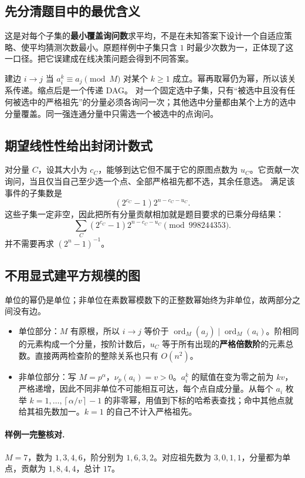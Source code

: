 \documentclass[UTF8,a4paper,11pt,oneside,openany,fontset=fandol]{ctexbook}
\theoremstyle{definition}
\newcommand{\ord}{\operatorname{ord}}
\newcommand{\ceil}[1]{\left\lceil #1\right\rceil}
\begin{document}
\subsection{先分清题目中的最优含义}
这是对每个子集的\textbf{最小覆盖询问数}求平均，不是在未知答案下设计一个自适应策略、使平均猜测次数最小。原题样例中子集只含 $1$ 时最少次数为一，正体现了这一口径。把它误建成在线决策问题会得到不同答案。

建边 $i\to j$ 当 $a_i^k\equiv a_j\pmod M$ 对某个 $k\ge1$ 成立。幂再取幂仍为幂，所以该关系传递。缩点后是一个传递 DAG。
对一个固定选中子集，只有“被选中且没有任何被选中的严格祖先”的分量必须各询问一次；其他选中分量都由某个上方的选中分量覆盖。同一强连通分量中只需选一个被选中的点询问。

\subsection{期望线性性给出封闭计数式}
对分量 $C$，设其大小为 $c_C$，能够到达它但不属于它的原图点数为 $u_C$。它贡献一次询问，当且仅当自己至少选一个点、全部严格祖先都不选，其余任意选。
满足该事件的子集数是
\[
 (2^{c_C}-1)2^{n-c_C-u_C}.
\]
这些子集一定非空，因此把所有分量贡献相加就是题目要求的已乘分母结果：
\[
 \boxed{\sum_C(2^{c_C}-1)2^{n-c_C-u_C}\pmod{998244353}}.
\]
并不需要再求 $(2^n-1)^{-1}$。

\subsection{不用显式建平方规模的图}
单位的幂仍是单位；非单位在素数幂模数下的正整数幂始终为非单位，故两部分之间没有边。
\begin{itemize}
\item 单位部分：$M$ 有原根，所以 $i\to j$ 等价于 $\ord_M(a_j)\mid\ord_M(a_i)$。阶相同的元素构成一个分量，按阶计数后，$u_C$ 等于所有出现的\textbf{严格倍数阶}的元素总数。直接两两检查阶的整除关系也只有 $O(n^2)$。
\item 非单位部分：写 $M=p^\alpha$，$\nu_p(a_i)=v>0$。$a_i^k$ 的赋值在变为零之前为 $kv$，严格递增，因此不同非单位不可能相互可达，每个点自成分量。从每个 $a_i$ 枚举 $k=1,\ldots,\ceil{\alpha/v}-1$ 的非零幂，用值到下标的哈希表查找；命中其他点就给其祖先数加一。$k=1$ 的自己不计入严格祖先。
\end{itemize}

\paragraph{样例一完整核对.}
$M=7$，数为 $1,3,4,6$，阶分别为 $1,6,3,2$。对应祖先数为 $3,0,1,1$，分量都为单点，贡献为 $1,8,4,4$，总计 $17$。
\end{document}
